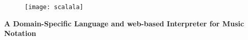 \chapter*{}
\begingroup
{\makeatletter

\begin{figure}[h]
\centering
\texttt{[image: scalala]}
\end{figure}

\bigskip
\bigskip

\begin{center}
\Huge\textbf{A Domain-Specific Language \newline and web-based Interpreter \newline for Music Notation}
\newline
\newline
\LARGE\textbf{\@author}
\end{center}

\makeatother}
\endgroup